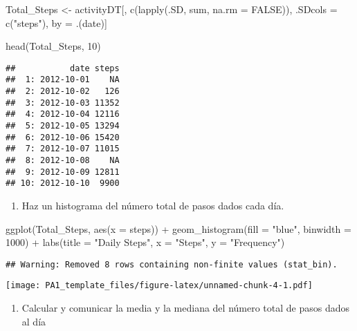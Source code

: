 \documentclass[
]{article}
\newenvironment{Shaded}{\begin{snugshade}}{\end{snugshade}}
\newcommand{\AttributeTok}[1]{\textcolor[rgb]{0.77,0.63,0.00}{#1}}
\newcommand{\ConstantTok}[1]{\textcolor[rgb]{0.00,0.00,0.00}{#1}}
\newcommand{\DecValTok}[1]{\textcolor[rgb]{0.00,0.00,0.81}{#1}}
\newcommand{\FunctionTok}[1]{\textcolor[rgb]{0.00,0.00,0.00}{#1}}
\newcommand{\NormalTok}[1]{#1}
\newcommand{\OtherTok}[1]{\textcolor[rgb]{0.56,0.35,0.01}{#1}}
\newcommand{\SpecialCharTok}[1]{\textcolor[rgb]{0.00,0.00,0.00}{#1}}
\newcommand{\StringTok}[1]{\textcolor[rgb]{0.31,0.60,0.02}{#1}}
\providecommand{\tightlist}{%
  \setlength{\itemsep}{0pt}\setlength{\parskip}{0pt}}
\begin{document}
\begin{Shaded}
\begin{Highlighting}[]
\NormalTok{Total\_Steps }\OtherTok{\textless{}{-}}\NormalTok{ activityDT[, }\FunctionTok{c}\NormalTok{(}\FunctionTok{lapply}\NormalTok{(.SD, sum, }\AttributeTok{na.rm =} \ConstantTok{FALSE}\NormalTok{)), .SDcols }\OtherTok{=} \FunctionTok{c}\NormalTok{(}\StringTok{"steps"}\NormalTok{), by }\OtherTok{=}\NormalTok{ .(date)] }

\FunctionTok{head}\NormalTok{(Total\_Steps, }\DecValTok{10}\NormalTok{)}
\end{Highlighting}
\end{Shaded}

\begin{verbatim}
##           date steps
##  1: 2012-10-01    NA
##  2: 2012-10-02   126
##  3: 2012-10-03 11352
##  4: 2012-10-04 12116
##  5: 2012-10-05 13294
##  6: 2012-10-06 15420
##  7: 2012-10-07 11015
##  8: 2012-10-08    NA
##  9: 2012-10-09 12811
## 10: 2012-10-10  9900
\end{verbatim}

\begin{enumerate}
\def\labelenumi{\arabic{enumi}.}
\setcounter{enumi}{1}
\tightlist
\item
  Haz un histograma del número total de pasos dados cada día.
\end{enumerate}

\begin{Shaded}
\begin{Highlighting}[]
\FunctionTok{ggplot}\NormalTok{(Total\_Steps, }\FunctionTok{aes}\NormalTok{(}\AttributeTok{x =}\NormalTok{ steps)) }\SpecialCharTok{+}
    \FunctionTok{geom\_histogram}\NormalTok{(}\AttributeTok{fill =} \StringTok{"blue"}\NormalTok{, }\AttributeTok{binwidth =} \DecValTok{1000}\NormalTok{) }\SpecialCharTok{+}
    \FunctionTok{labs}\NormalTok{(}\AttributeTok{title =} \StringTok{"Daily Steps"}\NormalTok{, }\AttributeTok{x =} \StringTok{"Steps"}\NormalTok{, }\AttributeTok{y =} \StringTok{"Frequency"}\NormalTok{)}
\end{Highlighting}
\end{Shaded}

\begin{verbatim}
## Warning: Removed 8 rows containing non-finite values (stat_bin).
\end{verbatim}

\texttt{[image: PA1\_template\_files/figure-latex/unnamed-chunk-4-1.pdf]}

\begin{enumerate}
\def\labelenumi{\arabic{enumi}.}
\setcounter{enumi}{2}
\tightlist
\item
  Calcular y comunicar la media y la mediana del número total de pasos
  dados al día
\end{enumerate}
\end{document}
